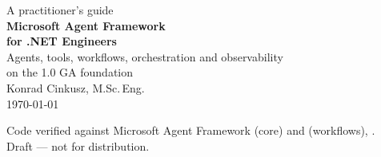 \begin{titlepage}
\centering
\vspace*{3.2cm}

{\color{mafgrey}\large A practitioner's guide}\\[1.2cm]

{\Huge\bfseries\color{mafblue} Microsoft Agent Framework}\\[0.5cm]
{\LARGE\bfseries\color{mafblue} for .NET Engineers}\\[1.6cm]

{\large Agents, tools, workflows, orchestration and observability\\
on the 1.0 GA foundation}\\[3.2cm]

{\Large Konrad Cinkusz, M.Sc.\,Eng.}\\[0.6cm]
{\color{mafgrey} \today}

\vfill

{\small\color{mafgrey}
Code verified against Microsoft Agent Framework \mafcore{} (core) and
\mafworkflows{} (workflows), \mafdate.\\
Draft --- not for distribution.}

\end{titlepage}

\cleardoublepage
